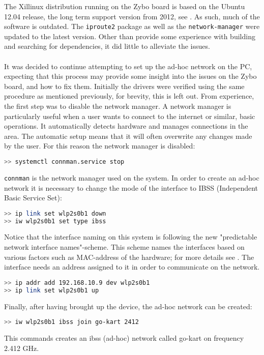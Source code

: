 The Xillinux distribution running on the Zybo board is based on the Ubuntu 12.04 release, the long term support version from 2012, see \cite{xillinux}.
As such, much of the software is outdated.
The \texttt{iproute2} package as well as the \texttt{network-manager} were updated to the latest version.
Other than provide some experience with building and searching for dependencies, it did little to alleviate the issues.
\\~\\
It was decided to continue attempting to set up the ad-hoc network on the PC, expecting that this process may provide some insight into the issues on the Zybo board, and how to fix them.
Initially the drivers were verified using the same procedure as mentioned previously, for brevity, this is left out.
From experience, the first step was to disable the network manager.
A network manager is particularly useful when a user wants to connect to the internet or similar, basic operations.
It automatically detects hardware and manages connections in the area.
The automatic setup means that it will often overwrite any changes made by the user.
For this reason the network manager is disabled:
\begin{lstlisting}[language=bash]
>> systemctl connman.service stop
\end{lstlisting}
\texttt{connman} is the network manager used on the system.
In order to create an ad-hoc network it is necessary to change the mode of the interface to IBSS (Independent Basic Service Set):
\begin{lstlisting}[language=bash]
>> ip link set wlp2s0b1 down
>> iw wlp2s0b1 set type ibss
\end{lstlisting}
Notice that the interface naming on this system is following the new "predictable network interface names"-scheme.
This scheme names the interfaces based on various factors such as MAC-address of the hardware; for more details see \cite{interfacenaming}.
The interface needs an address assigned to it in order to communicate on the network.
\begin{lstlisting}[language=bash]
>> ip addr add 192.168.10.9 dev wlp2s0b1
>> ip link set wlp2s0b1 up
\end{lstlisting}
Finally, after having brought up the device, the ad-hoc network can be created:
\begin{lstlisting}[language=bash]
>> iw wlp2s0b1 ibss join go-kart 2412
\end{lstlisting}
This commands creates an ibss (ad-hoc) network called go-kart on frequency 2.412 \si{\giga\hertz}.
